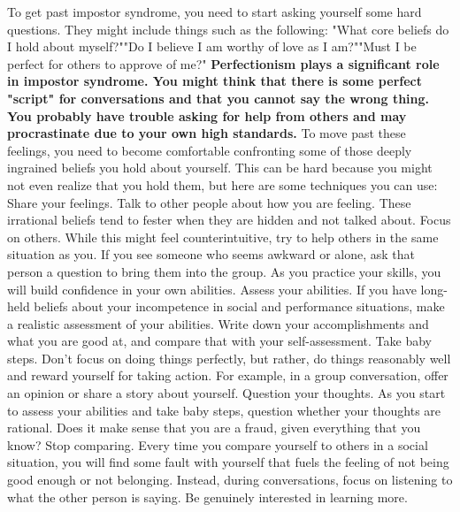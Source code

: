 \documentclass[14pt,a4paper]{extarticle}
\begin{document}
To get past impostor syndrome, you need to start asking yourself some hard questions. They might include things such as the following:
\newline\newline 
"What core beliefs do I hold about myself?""Do I believe I am worthy of love as I am?""Must I be perfect for others to approve of me?"
\newline\newline \textbf{
Perfectionism plays a significant role in impostor syndrome. You might think that there is some perfect "script" for conversations and that you cannot say the wrong thing. You probably have trouble asking for help from others and may procrastinate due to your own high standards.}\newline\newline 
To move past these feelings, you need to become comfortable confronting some of those deeply ingrained beliefs you hold about yourself. This can be hard because you might not even realize that you hold them, but here are some techniques you can use:
\newline\newline 
Share your feelings. Talk to other people about how you are feeling. These irrational beliefs tend to fester when they are hidden and not talked about.
Focus on others. While this might feel counterintuitive, try to help others in the same situation as you. If you see someone who seems awkward or alone, ask that person a question to bring them into the group. As you practice your skills, you will build confidence in your own abilities.
Assess your abilities. If you have long-held beliefs about your incompetence in social and performance situations, make a realistic assessment of your abilities. Write down your accomplishments and what you are good at, and compare that with your self-assessment.
Take baby steps. Don't focus on doing things perfectly, but rather, do things reasonably well and reward yourself for taking action. For example, in a group conversation, offer an opinion or share a story about yourself.
Question your thoughts. As you start to assess your abilities and take baby steps, question whether your thoughts are rational. Does it make sense that you are a fraud, given everything that you know?
Stop comparing. Every time you compare yourself to others in a social situation, you will find some fault with yourself that fuels the feeling of not being good enough or not belonging. Instead, during conversations, focus on listening to what the other person is saying. Be genuinely interested in learning more.
\end{document}
